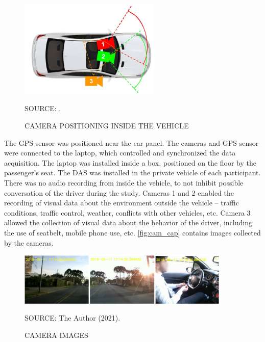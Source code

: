 \begin{figure}[!htbp]
    \centering\footnotesize
    \captionsetup{font=footnotesize}
    \caption{CAMERA POSITIONING INSIDE THE VEHICLE}
    \includegraphics[width=0.6\textwidth]{fig/cam_install.png}
    \label{fig:cam_install}
    \par SOURCE: \textcite{Amancio2021}.
\end{figure}

The GPS sensor was positioned near the car panel. The cameras and GPS sensor were connected to the laptop, which controlled and synchronized the data acquisition. The laptop was installed inside a box, positioned on the floor by the passenger's seat. The DAS was installed in the private vehicle of each participant. There was no audio recording from inside the vehicle, to not inhibit possible conversation of the driver during the study. Cameras 1 and 2 enabled the recording of visual data about the environment outside the vehicle – traffic conditions, traffic control, weather, conflicts with other vehicles, etc. Camera 3 allowed the collection of visual data about the behavior of the driver, including the use of seatbelt, mobile phone use, etc. \autoref{fig:cam_cap} contains images collected by the cameras.  

\begin{figure}[!htbp]
    \centering\footnotesize
    \captionsetup{font=footnotesize}
    \caption{CAMERA IMAGES}
    \includegraphics[width=0.9\textwidth]{fig/cam_cap.png}
    \label{fig:cam_cap}
    \par SOURCE: The Author (2021).
\end{figure}

